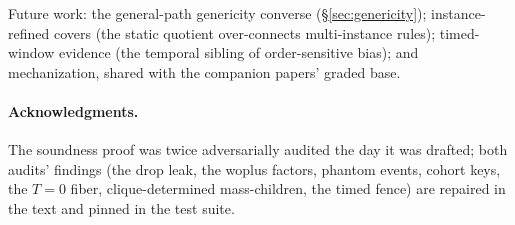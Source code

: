 \documentclass[11pt]{article}
\theoremstyle{definition}
\theoremstyle{remark}
\begin{document}
Future work: the general-path genericity converse
(\S\ref{sec:genericity}); instance-refined covers (the static
quotient over-connects multi-instance rules); timed-window evidence
(the temporal sibling of order-sensitive bias); and mechanization,
shared with the companion papers' graded base.

\paragraph{Acknowledgments.}  The soundness proof was twice
adversarially audited the day it was drafted; both audits' findings
(the drop leak, the woplus factors, phantom events, cohort keys, the
$T{=}0$ fiber, clique-determined mass-children, the timed fence) are
repaired in the text and pinned in the test suite.



\end{document}
